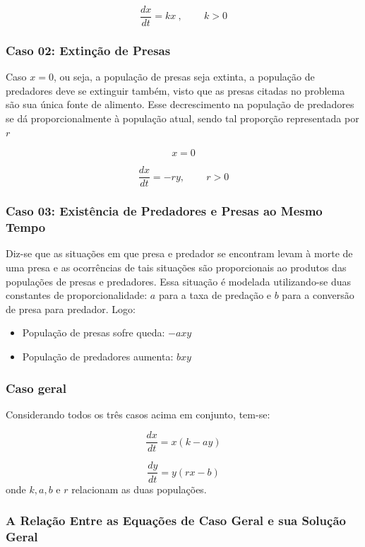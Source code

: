     				\[\frac{dx}{dt} = kx\ \text{, }\qquad k > 0\]
				
		    \subsubsection{Caso 02: Extinção de Presas}
			
    			Caso $x = 0$, ou seja, a população de presas seja extinta, a população de predadores deve se extinguir também, visto que as presas citadas no problema são sua única fonte de alimento. Esse decrescimento na população de predadores se dá proporcionalmente à população atual, sendo tal proporção representada por $r$
    			
    				\[x = 0\]
    				
    				\[\frac{dx}{dt} = - ry \text{, }\qquad r > 0\]
				
		    \subsubsection{Caso 03: Existência de Predadores e Presas ao Mesmo Tempo}
		    
    			Diz-se que as situações em que presa e predador se encontram levam à morte de uma presa e as ocorrências de tais situações são proporcionais ao produtos das populações de presas e predadores. Essa situação é modelada utilizando-se duas constantes de proporcionalidade: $a$ para a taxa de predação e $b$ para a conversão de presa para predador. Logo:
    			
    			\begin{itemize}
    				\item População de presas sofre queda: $-axy$
    				\item População de predadores aumenta: $bxy$
    			\end{itemize}
		
		    \subsubsection{Caso geral}
		    
    			Considerando todos os três casos acima em conjunto, tem-se:
    			
    				\[\frac{dx}{dt} = x (k - a y)\]
    				
    				\[\frac{dy}{dt} = y (r x - b)\]
    			onde $k, a, b \text{ e }r$ relacionam as duas populações.
			
        	\subsubsection{A Relação Entre as Equações de Caso Geral e sua Solução Geral}
	
